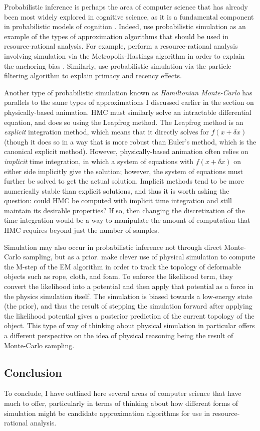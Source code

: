 \documentclass[12pt]{article}
\begin{document}
Probabilistic inference is perhaps the area of computer science that has already been most widely explored in cognitive science, as it is a fundamental component in probabilistic models of cognition \citep{Tenenbaum2011}. Indeed, \cite{Griffiths2015} use probabilistic simulation as an example of the types of approximation algorithms that should be used in resource-rational analysis. For example, \cite{Lieder2012} perform a resource-rational analysis involving simulation via the Metropolis-Hastings algorithm in order to explain the anchoring bias \citep{Tversky1974}. Similarly, \cite{Abbott2011} use probabilistic simulation via the particle filtering algorithm to explain primacy and recency effects.

Another type of probabilistic simulation known as \textit{Hamiltonian Monte-Carlo} \citep{Neal2011} has parallels to the same types of approximations I discussed earlier in the section on physically-based animation. HMC must similarly solve an intractable differential equation, and does so using the Leapfrog method. The Leapfrog method is an \textit{explicit} integration method, which means that it directly solves for $f(x+\delta x)$ (though it does so in a way that is more robust than Euler's method, which is the canonical explicit method). However, physically-based animation often relies on \textit{implicit} time integration, in which a system of equations with $f(x+\delta x)$ on either side implicitly give the solution; however, the system of equations must further be solved to get the actual solution. Implicit methods tend to be more numerically stable than explicit solutions, and thus it is worth asking the question: could HMC be computed with implicit time integration and still maintain its desirable properties? If so, then changing the discretization of the time integration would be a way to manipulate the amount of computation that HMC requires beyond just the number of samples.

Simulation may also occur in probabilistic inference not through direct Monte-Carlo sampling, but as a prior. \cite{Schulman2013b} make clever use of physical simulation to compute the M-step of the EM algorithm in order to track the topology of deformable objects such as rope, cloth, and foam. To enforce the likelihood term, they convert the likelihood into a potential and then apply that potential as a force in the physics simulation itself. The simulation is biased towards a low-energy state (the prior), and thus the result of stepping the simulation forward after applying the likelihood potential gives a posterior prediction of the current topology of the object. This type of way of thinking about physical simulation in particular offers a different perspective on the idea of physical reasoning being the result of Monte-Carlo sampling.

\subsection*{Conclusion}

To conclude, I have outlined here several areas of computer science that have much to offer, particularly in terms of thinking about how different forms of simulation might be candidate approximation algorithms for use in resource-rational analysis.

\end{document}
